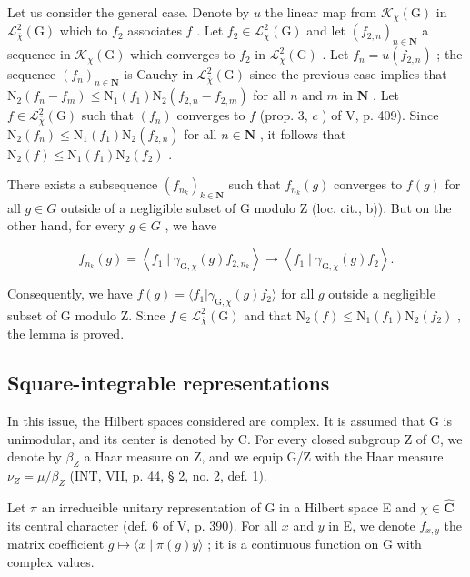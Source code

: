  Let us consider the general case. Denote by \(u\) the linear map from \(\mathcal{K}_{\chi}(\mathrm{G})\) in \(\mathcal{L}_{\overline{\chi}}^{2}(\mathrm{G})\) which to \(f_{2}\) associates \(f\) . Let \(f_{2} \in \mathcal{L}_{\chi}^{2}(\mathrm{G})\) and let \((f_{2,n})_{n \in \mathbf{N}}\) a sequence in \(\mathcal{K}_{\chi}(\mathrm{G})\) which converges to \(f_{2}\) in \(\mathcal{L}_{\chi}^{2}(\mathrm{G})\) . Let \(f_{n} = u(f_{2,n})\) ; the sequence \((f_{n})_{n \in \mathbf{N}}\) is Cauchy in \(\mathcal{L}_{\overline{\chi}}^{2}(\mathrm{G})\) since the previous case implies that \(\mathrm{N}_{2}(f_{n} - f_{m}) \leqslant \mathrm{N}_{1}(f_{1})\mathrm{N}_{2}(f_{2,n} - f_{2,m})\) for all \(n\) and \(m\) in \(\mathbf{N}\) . Let \(f \in \mathcal{L}_{\overline{\chi}}^{2}(\mathrm{G})\) such that \((f_{n})\) converges to \(f\) (prop. 3, \(c\) ) of V, p. 409). Since \(\mathrm{N}_{2}(f_{n}) \leqslant \mathrm{N}_{1}(f_{1})\mathrm{N}_{2}(f_{2,n})\) for all \(n \in \mathbf{N}\) , it follows that \(\mathrm{N}_{2}(f) \leqslant \mathrm{N}_{1}(f_{1})\mathrm{N}_{2}(f_{2})\) .

There exists a subsequence \((f_{n_{k}})_{k\in\mathbf{N}}\) such that \(f_{n_{k}}(g)\) converges to \(f(g)\) for all \(g\in G\) outside of a negligible subset of G modulo Z (loc. cit., b)). But on the other hand, for every \(g\in G\) , we have

\[
f _ {n _ {k}} (g) = \left\langle f _ {1} \mid \gamma_ {\mathrm{G}, \chi} (g) f _ {2, n _ {k}} \right\rangle\rightarrow \left\langle f _ {1} \mid \gamma_ {\mathrm{G}, \chi} (g) f _ {2} \right\rangle .
\]

Consequently, we have \(f(g) = \langle f_1 | \gamma_{\mathrm{G},\chi}(g)f_2 \rangle\) for all \(g\) outside a negligible subset of G modulo Z. Since \(f \in \mathcal{L}_{\overline{\chi}}^2(\mathrm{G})\) and that \(\mathrm{N}_2(f) \leqslant \mathrm{N}_1(f_1)\mathrm{N}_2(f_2)\) , the lemma is proved.

\subsection{Square-integrable representations}

In this issue, the Hilbert spaces considered are complex. It is assumed that G is unimodular, and its center is denoted by C. For every closed subgroup Z of C, we denote by \(\beta_{Z}\) a Haar measure on Z, and we equip G/Z with the Haar measure \(\nu_{Z} = \mu/\beta_{Z}\) (INT, VII, p. 44, § 2, no. 2, def. 1).

Let \(\pi\) an irreducible unitary representation of G in a Hilbert space E and \(\chi \in \widehat{\mathbf{C}}\) its central character (def. 6 of V, p. 390). For all \(x\) and \(y\) in E, we denote \(f_{x,y}\) the matrix coefficient \(g \mapsto \langle x \mid \pi(g)y \rangle\) ; it is a continuous function on G with complex values.

